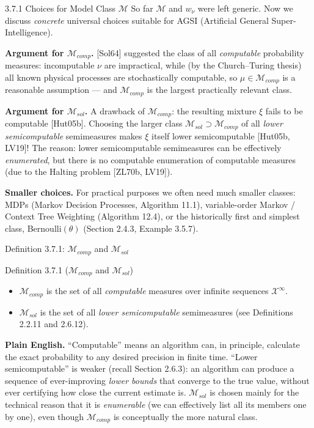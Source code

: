 \documentclass[aspectratio=169,10pt]{beamer}
\newcommand{\X}{\mathcal{X}}
\newcommand{\Mcal}{\mathcal{M}}
\begin{document}
\begin{frame}{3.7.1 Choices for Model Class $\Mcal$}
  So far $\Mcal$ and $w_\nu$ were left generic. Now we discuss \emph{concrete}
  universal choices suitable for AGSI (Artificial General Super-Intelligence).

  \textbf{Argument for $\Mcal_{comp}$.} [Sol64] suggested the class of all
  \emph{computable} probability measures: incomputable $\nu$ are impractical,
  while (by the Church--Turing thesis) all known physical processes are
  stochastically computable, so $\mu\in\Mcal_{comp}$ is a reasonable
  assumption --- and $\Mcal_{comp}$ is the largest practically relevant class.

  \textbf{Argument for $\Mcal_{sol}$.} A drawback of $\Mcal_{comp}$: the
  resulting mixture $\xi$ fails to be computable [Hut05b]. Choosing the
  larger class $\Mcal_{sol}\supset\Mcal_{comp}$ of all \emph{lower
  semicomputable} semimeasures makes $\xi$ itself lower semicomputable
  [Hut05b, LV19]! The reason: lower semicomputable semimeasures can be
  effectively \emph{enumerated}, but there is no computable enumeration of
  computable measures (due to the Halting problem [ZL70b, LV19]).

  \textbf{Smaller choices.} For practical purposes we often need much smaller
  classes: MDPs (Markov Decision Processes, Algorithm 11.1), variable-order
  Markov / Context Tree Weighting (Algorithm 12.4), or the historically first
  and simplest class, Bernoulli$(\theta)$ (Section 2.4.3, Example 3.5.7).
\end{frame}

\begin{frame}{Definition 3.7.1: $\Mcal_{comp}$ and $\Mcal_{sol}$}
  \begin{block}{Definition 3.7.1 ($\Mcal_{comp}$ and $\Mcal_{sol}$)}
    \begin{itemize}
      \item $\Mcal_{comp}$ is the set of all \emph{computable} measures over
        infinite sequences $\X^\infty$.
      \item $\Mcal_{sol}$ is the set of all \emph{lower semicomputable}
        semimeasures (see Definitions 2.2.11 and 2.6.12).
    \end{itemize}
  \end{block}
  \textbf{Plain English.} ``Computable'' means an algorithm can, in
  principle, calculate the exact probability to any desired precision in
  finite time. ``Lower semicomputable'' is weaker (recall Section 2.6.3): an
  algorithm can produce a sequence of ever-improving \emph{lower bounds} that
  converge to the true value, without ever certifying how close the current
  estimate is. $\Mcal_{sol}$ is chosen mainly for the technical reason that
  it is \emph{enumerable} (we can effectively list all its members one by
  one), even though $\Mcal_{comp}$ is conceptually the more natural class.
\end{frame}
\end{document}
